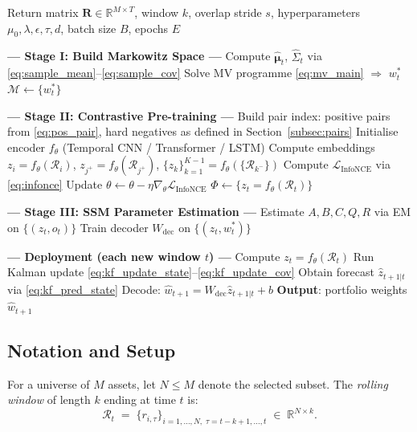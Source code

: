 \documentclass[preprint,12pt]{elsarticle}
\theoremstyle{plain}
\theoremstyle{definition}
\newcommand{\R}{\mathbb{R}}
\newcommand{\calM}{\mathcal{M}}
\newcommand{\calR}{\mathcal{R}}
\newcommand{\bmu}{\bm{\mu}}
\begin{document}
\begin{algorithm}[H]
	\caption{$\Phi$-Space: Training and Deployment}
	\label{alg:phi_space}
	\scriptsize
	\begin{algorithmic}[1]
		\Require Return matrix $\mathbf{R} \in \R^{M \times T}$, window $k$,
		overlap stride $s$, hyperparameters
		$\mu_0, \lambda, \epsilon, \tau, d$, batch size $B$, epochs $E$
		
		\Statex \textbf{--- Stage I: Build Markowitz Space ---}
		\State Compute $\hat{\bmu}_t$, $\hat{\Sigma}_t$ via \eqref{eq:sample_mean}--\eqref{eq:sample_cov}
		\State Solve MV programme \eqref{eq:mv_main} $\Rightarrow$ $w_t^*$
		\EndFor
		\State $\calM \leftarrow \{w_t^*\}$
		
		\Statex \textbf{--- Stage II: Contrastive Pre-training ---}
		\State Build pair index: positive pairs from \eqref{eq:pos_pair},
		hard negatives as defined in Section~\ref{subsec:pairs}
		\State Initialise encoder $f_\theta$ (Temporal CNN / Transformer / LSTM)
		\State Compute embeddings $z_i = f_\theta(\calR_i)$,
		$z_{j^+} = f_\theta(\calR_{j^+})$,
		$\{z_k\}_{k=1}^{K-1} = f_\theta(\{\calR_{k^-}\})$
		\State Compute $\mathcal{L}_{\text{InfoNCE}}$ via \eqref{eq:infonce}
		\State Update $\theta \leftarrow \theta - \eta \nabla_\theta
		\mathcal{L}_{\text{InfoNCE}}$
		\EndFor
		\EndFor
		\State $\Phi \leftarrow \{z_t = f_\theta(\calR_t)\}$
		
		\Statex \textbf{--- Stage III: SSM Parameter Estimation ---}
		\State Estimate $A, B, C, Q, R$ via EM on $\{(z_t, o_t)\}$
		\State Train decoder $W_{\text{dec}}$ on $\{(z_t, w_t^*)\}$
		
		\Statex \textbf{--- Deployment (each new window $t$) ---}
		\State Compute $z_t = f_\theta(\calR_t)$
		\State Run Kalman update \eqref{eq:kf_update_state}--\eqref{eq:kf_update_cov}
		\State Obtain forecast $\hat{z}_{t+1|t}$ via \eqref{eq:kf_pred_state}
		\State Decode: $\hat{w}_{t+1} = W_{\text{dec}}\hat{z}_{t+1|t} + b$
		\State \textbf{Output}: portfolio weights $\hat{w}_{t+1}$
	\end{algorithmic}
\end{algorithm}

\subsection{Notation and Setup}
\label{sec:notation}

For a universe of $M$ assets, let $N \leq M$ denote the selected subset.  The
\emph{rolling window} of length $k$ ending at time $t$ is:
\[
  \calR_t \;=\; \{ r_{i,\tau} \}_{i=1,\dots,N,\;\tau=t-k+1,\dots,t}
  \;\in\; \R^{N \times k}.
\]
\end{document}
